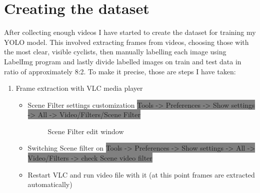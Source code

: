 \section{Creating the dataset}
\label{sec: dataset}
After collecting enough videos I have started to create the dataset for training my YOLO model. This involved extracting frames from videos, choosing those with the most clear, visible cyclists, then manually labelling each image using LabelImg program and lastly divide labelled images on train and test data in ratio of approximately 8:2. To make it precise, those are steps I have taken:
\begin{enumerate}
    \item Frame extraction with VLC media player
    \begin{itemize}
        \item Scene Filter settings customization
        \newline \colorbox{Gray}{Tools -> Preferences -> Show settings -> All -> Video/Filters/Scene Filter}
        \begin{figure}[H]
            \centering
            \caption{Scene Filter edit window}
            \label{fig:vlc1}
        \end{figure}
        \item Switching Scene filter on
        \newline \colorbox{Gray}{Tools -> Preferences -> Show settings -> All -> Video/Filters -> check Scene video filter}
        \item Restart VLC and run video file with it (at this point frames are extracted automatically) 

\end{itemize}
\end{enumerate}
